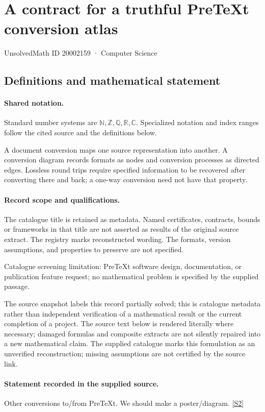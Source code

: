 \documentclass[11pt]{article}
\newcommand{\sref}[2]{\hyperlink{source:#1:#2}{[S#2]}}
\begin{document}
\setcounter{section}{20002158}
\section{A contract for a truthful PreTeXt conversion atlas}\label{20002159}
{\small\sffamily UnsolvedMath ID 20002159 · Computer Science}
\subsection{Definitions and mathematical statement}

\paragraph{Shared notation.}Standard number systems are $\mathbb N,\mathbb Z,\mathbb Q,\mathbb R,\mathbb C$. Specialized notation and index ranges follow the cited source and the definitions below.


A document conversion maps one source representation into another. A conversion diagram records formats as nodes and conversion processes as directed edges. Lossless round trips require specified information to be recovered after converting there and back; a one-way conversion need not have that property.
\paragraph{Record scope and qualifications.}
The catalogue title is retained as metadata. Named certificates, contracts, bounds or frameworks in that title are not asserted as results of the original source extract.
The registry marks reconstructed wording. The formats, version assumptions, and properties to preserve are not specified.

Catalogue screening limitation: PreTeXt software design, documentation, or publication feature request; no mathematical problem is specified by the supplied passage.

The source snapshot labels this record partially solved; this is catalogue metadata rather than independent verification of a mathematical result or the current completion of a project.
The source text below is rendered literally where necessary; damaged formulas and composite extracts are not silently repaired into a new mathematical claim.
The supplied catalogue marks this formulation as an unverified reconstruction; missing assumptions are not certified by the source link.
\paragraph{Statement recorded in the supplied source.}
Other conversions to/from PreTeXt. We should make a poster/diagram. \sref{20002159}{2}
\end{document}
